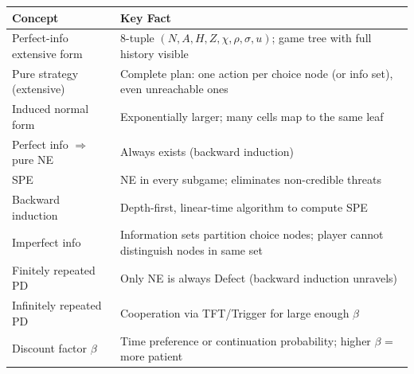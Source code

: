 \begin{center}
\renewcommand{\arraystretch}{1.4}
\begin{tabular}{@{} l p{9.5cm} @{}}
\toprule
\textbf{Concept} & \textbf{Key Fact} \\
\midrule
Perfect-info extensive form & 8-tuple $(N, A, H, Z, \chi, \rho, \sigma, u)$; game tree with full history visible \\
Pure strategy (extensive) & Complete plan: one action per choice node (or info set), even unreachable ones \\
Induced normal form & Exponentially larger; many cells map to the same leaf \\
Perfect info $\Rightarrow$ pure NE & Always exists (backward induction) \\
SPE & NE in every subgame; eliminates non-credible threats \\
Backward induction & Depth-first, linear-time algorithm to compute SPE \\
Imperfect info & Information sets partition choice nodes; player cannot distinguish nodes in same set \\
Finitely repeated PD & Only NE is always Defect (backward induction unravels) \\
Infinitely repeated PD & Cooperation via TFT/Trigger for large enough $\beta$ \\
Discount factor $\beta$ & Time preference or continuation probability; higher $\beta$ = more patient \\
\bottomrule
\end{tabular}
\end{center}

\bigseparator
